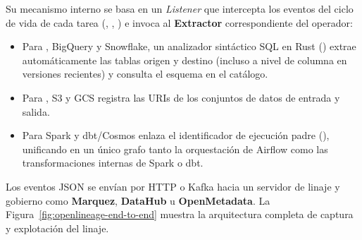 Su mecanismo interno se basa en un \textit{Listener} que intercepta los eventos del ciclo de vida de cada tarea (, , ) e invoca al \textbf{Extractor} correspondiente del operador:
\begin{itemize}
  \item Para , BigQuery y Snowflake, un analizador sintáctico SQL en Rust () extrae automáticamente las tablas origen y destino (incluso a nivel de columna en versiones recientes) y consulta el esquema en el catálogo.
  \item Para , S3 y GCS registra las URIs de los conjuntos de datos de entrada y salida.
  \item Para Spark y dbt/Cosmos enlaza el identificador de ejecución padre (), unificando en un único grafo tanto la orquestación de Airflow como las transformaciones internas de Spark o dbt.
\end{itemize}

Los eventos JSON se envían por HTTP o Kafka hacia un servidor de linaje y gobierno como \textbf{Marquez}, \textbf{DataHub} u \textbf{OpenMetadata}. La Figura~\ref{fig:openlineage-end-to-end} muestra la arquitectura completa de captura y explotación del linaje.

